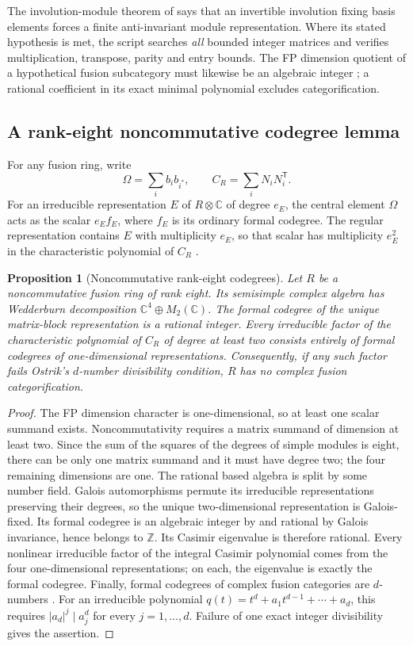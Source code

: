 \documentclass[11pt,reqno]{amsart}
\newtheorem{proposition}[theorem]{Proposition}
\theoremstyle{definition}
\theoremstyle{remark}
\newcommand{\C}{\mathbb C}
\newcommand{\Z}{\mathbb Z}
\begin{document}
The involution-module theorem of \cite[Section~5]{R6} says that an invertible involution fixing basis elements forces a finite anti-invariant module representation. Where its stated hypothesis is met, the script searches \emph{all} bounded integer matrices and verifies multiplication, transpose, parity and entry bounds. The FP dimension quotient of a hypothetical fusion subcategory must likewise be an algebraic integer \cite[Proposition~8.15]{EGNO}; a rational coefficient in its exact minimal polynomial excludes categorification.

\subsection{A rank-eight noncommutative codegree lemma}
For any fusion ring, write
\[
\Omega=\sum_i b_i b_{i^*},\qquad
C_R=\sum_iN_iN_i^{\mathsf T}.
\]
For an irreducible representation $E$ of $R\otimes\C$ of degree $e_E$, the central element $\Omega$ acts as the scalar $e_E f_E$, where $f_E$ is its ordinary formal codegree. The regular representation contains $E$ with multiplicity $e_E$, so that scalar has multiplicity $e_E^2$ in the characteristic polynomial of $C_R$ \cite{OstrikCode,R6}.

\begin{proposition}[Noncommutative rank-eight codegrees]\label{prop:noncomm}
Let $R$ be a noncommutative fusion ring of rank eight. Its semisimple complex algebra has Wedderburn decomposition $\C^4\oplus M_2(\C)$. The formal codegree of the unique matrix-block representation is a rational integer. Every irreducible factor of the characteristic polynomial of $C_R$ of degree at least two consists entirely of formal codegrees of one-dimensional representations. Consequently, if any such factor fails Ostrik's $d$-number divisibility condition, $R$ has no complex fusion categorification.
\end{proposition}
\begin{proof}
The FP dimension character is one-dimensional, so at least one scalar summand exists. Noncommutativity requires a matrix summand of dimension at least two. Since the sum of the squares of the degrees of simple modules is eight, there can be only one matrix summand and it must have degree two; the four remaining dimensions are one. The rational based algebra is split by some number field. Galois automorphisms permute its irreducible representations preserving their degrees, so the unique two-dimensional representation is Galois-fixed. Its formal codegree is an algebraic integer by \cite{OstrikCode} and rational by Galois invariance, hence belongs to $\Z$. Its Casimir eigenvalue is therefore rational. Every nonlinear irreducible factor of the integral Casimir polynomial comes from the four one-dimensional representations; on each, the eigenvalue is exactly the formal codegree. Finally, formal codegrees of complex fusion categories are $d$-numbers \cite{OstrikCode}. For an irreducible polynomial $q(t)=t^d+a_1t^{d-1}+\cdots+a_d$, this requires $|a_d|^j\mid a_j^d$ for every $j=1,\dots,d$. Failure of one exact integer divisibility gives the assertion.
\end{proof}
\end{document}
